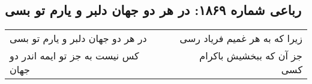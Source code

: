 \begin{center}
\section*{رباعی شماره ۱۸۶۹: در هر دو جهان دلبر و یارم تو بسی}
\label{sec:1869}
\begin{longtable}{l p{0.5cm} r}
در هر دو جهان دلبر و یارم تو بسی
&&
زیرا که به هر غمیم فریاد رسی
\\
کس نیست به جز تو ایمه اندر دو جهان
&&
جز آن که ببخشیش باکرام کسی
\\
\end{longtable}
\end{center}
